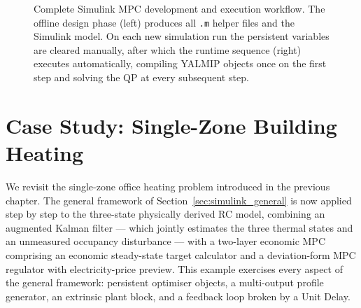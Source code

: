\begin{figure}[htbp]
{%
	}
	\caption{Complete Simulink MPC development and execution workflow.  The
		offline design phase (left) produces all \texttt{.m} helper files and
		the Simulink model.  On each new simulation run the persistent
		variables are cleared manually, after which the runtime sequence
		(right) executes automatically, compiling YALMIP objects once on the
		first step and solving the QP at every subsequent step.}
	\label{fig:workflow}
\end{figure}


\section{Case Study: Single-Zone Building Heating}
\label{sec:simulink_building}

We revisit the single-zone office heating problem introduced in the
previous chapter.  The general framework of
Section~\ref{sec:simulink_general} is now applied step by step to the
three-state physically derived RC model, combining an augmented Kalman
filter — which jointly estimates the three thermal states and an
unmeasured occupancy disturbance — with a two-layer economic MPC
comprising an economic steady-state target calculator and a
deviation-form MPC regulator with electricity-price preview.  This
example exercises every aspect of the general framework: persistent
optimiser objects, a multi-output profile generator, an extrinsic plant
block, and a feedback loop broken by a Unit Delay.

